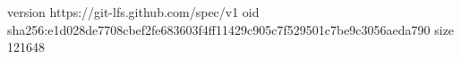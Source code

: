version https://git-lfs.github.com/spec/v1
oid sha256:e1d028de7708cbef2fe683603f4ff11429c905c7f529501c7be9c3056aeda790
size 121648
